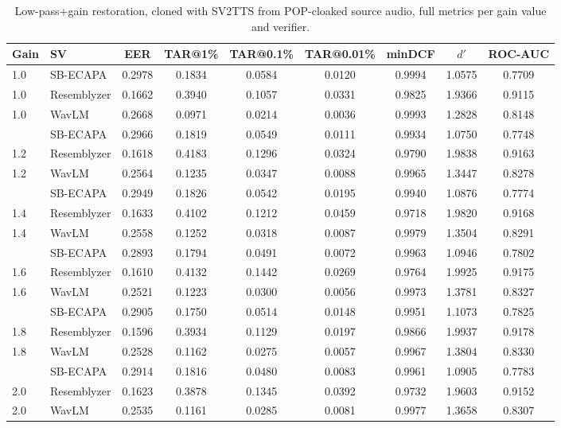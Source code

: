 \documentclass[11pt]{article}
\begin{document}
\begin{table}[H]
\centering
\caption{Low-pass+gain restoration, cloned with SV2TTS from
POP-cloaked source audio, full metrics per gain value and verifier.}
\label{tab:restoration-lowpass-results-pop}
\begin{tabular}{llccccccc}
\toprule
Gain & SV & EER & TAR@1\% & TAR@0.1\% & TAR@0.01\% & minDCF & $d'$ & ROC-AUC \\
\midrule
1.0 & SB-ECAPA    & 0.2978 & 0.1834 & 0.0584 & 0.0120 & 0.9994 & 1.0575 & 0.7709 \\
1.0 & Resemblyzer & 0.1662 & 0.3940 & 0.1057 & 0.0331 & 0.9825 & 1.9366 & 0.9115 \\
1.0 & WavLM       & 0.2668 & 0.0971 & 0.0214 & 0.0036 & 0.9993 & 1.2828 & 0.8148 \\
\addlinespace
1.2 & SB-ECAPA    & 0.2966 & 0.1819 & 0.0549 & 0.0111 & 0.9934 & 1.0750 & 0.7748 \\
1.2 & Resemblyzer & 0.1618 & 0.4183 & 0.1296 & 0.0324 & 0.9790 & 1.9838 & 0.9163 \\
1.2 & WavLM       & 0.2564 & 0.1235 & 0.0347 & 0.0088 & 0.9965 & 1.3447 & 0.8278 \\
\addlinespace
1.4 & SB-ECAPA    & 0.2949 & 0.1826 & 0.0542 & 0.0195 & 0.9940 & 1.0876 & 0.7774 \\
1.4 & Resemblyzer & 0.1633 & 0.4102 & 0.1212 & 0.0459 & 0.9718 & 1.9820 & 0.9168 \\
1.4 & WavLM       & 0.2558 & 0.1252 & 0.0318 & 0.0087 & 0.9979 & 1.3504 & 0.8291 \\
\addlinespace
1.6 & SB-ECAPA    & 0.2893 & 0.1794 & 0.0491 & 0.0072 & 0.9963 & 1.0946 & 0.7802 \\
1.6 & Resemblyzer & 0.1610 & 0.4132 & 0.1442 & 0.0269 & 0.9764 & 1.9925 & 0.9175 \\
1.6 & WavLM       & 0.2521 & 0.1223 & 0.0300 & 0.0056 & 0.9973 & 1.3781 & 0.8327 \\
\addlinespace
1.8 & SB-ECAPA    & 0.2905 & 0.1750 & 0.0514 & 0.0148 & 0.9951 & 1.1073 & 0.7825 \\
1.8 & Resemblyzer & 0.1596 & 0.3934 & 0.1129 & 0.0197 & 0.9866 & 1.9937 & 0.9178 \\
1.8 & WavLM       & 0.2528 & 0.1162 & 0.0275 & 0.0057 & 0.9967 & 1.3804 & 0.8330 \\
\addlinespace
2.0 & SB-ECAPA    & 0.2914 & 0.1816 & 0.0480 & 0.0083 & 0.9961 & 1.0905 & 0.7783 \\
2.0 & Resemblyzer & 0.1623 & 0.3878 & 0.1345 & 0.0392 & 0.9732 & 1.9603 & 0.9152 \\
2.0 & WavLM       & 0.2535 & 0.1161 & 0.0285 & 0.0081 & 0.9977 & 1.3658 & 0.8307 \\
\bottomrule
\end{tabular}
\end{table}
\end{document}
